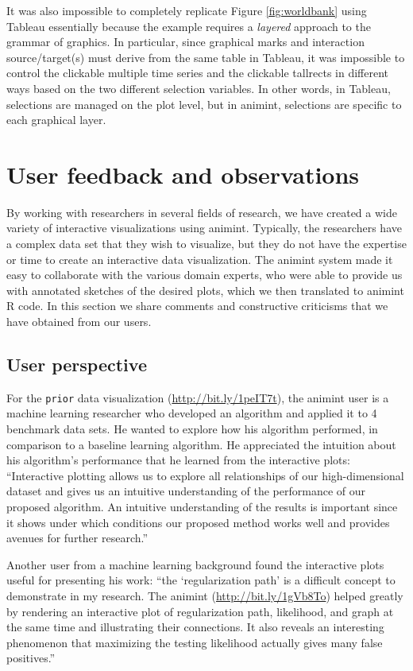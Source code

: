 \documentclass[12pt,]{article}
\theoremstyle{definition}
\theoremstyle{definition}
\theoremstyle{remark}
\begin{document}
It was also impossible to completely replicate Figure
\ref{fig:worldbank} using Tableau essentially because the example
requires a \emph{layered} approach to the grammar of graphics. In
particular, since graphical marks and interaction source/target(s) must
derive from the same table in Tableau, it was impossible to control the
clickable multiple time series and the clickable tallrects in different
ways based on the two different selection variables. In other words, in
Tableau, selections are managed on the plot level, but in animint,
selections are specific to each graphical layer.

\section{User feedback and
observations}\label{user-feedback-and-observations}

By working with researchers in several fields of research, we have
created a wide variety of interactive visualizations using animint.
Typically, the researchers have a complex data set that they wish to
visualize, but they do not have the expertise or time to create an
interactive data visualization. The animint system made it easy to
collaborate with the various domain experts, who were able to provide us
with annotated sketches of the desired plots, which we then translated
to animint R code. In this section we share comments and constructive
criticisms that we have obtained from our users.

\subsection{User perspective}\label{user-perspective}

For the \texttt{prior} data visualization (\url{http://bit.ly/1peIT7t}),
the animint user is a machine learning researcher who developed an
algorithm and applied it to 4 benchmark data sets. He wanted to explore
how his algorithm performed, in comparison to a baseline learning
algorithm. He appreciated the intuition about his algorithm's
performance that he learned from the interactive plots: ``Interactive
plotting allows us to explore all relationships of our high-dimensional
dataset and gives us an intuitive understanding of the performance of
our proposed algorithm. An intuitive understanding of the results is
important since it shows under which conditions our proposed method
works well and provides avenues for further research.''

Another user from a machine learning background found the interactive
plots useful for presenting his work: ``the `regularization path' is a
difficult concept to demonstrate in my research. The animint
(\url{http://bit.ly/1gVb8To}) helped greatly by rendering an interactive
plot of regularization path, likelihood, and graph at the same time and
illustrating their connections. It also reveals an interesting
phenomenon that maximizing the testing likelihood actually gives many
false positives.''
\end{document}
